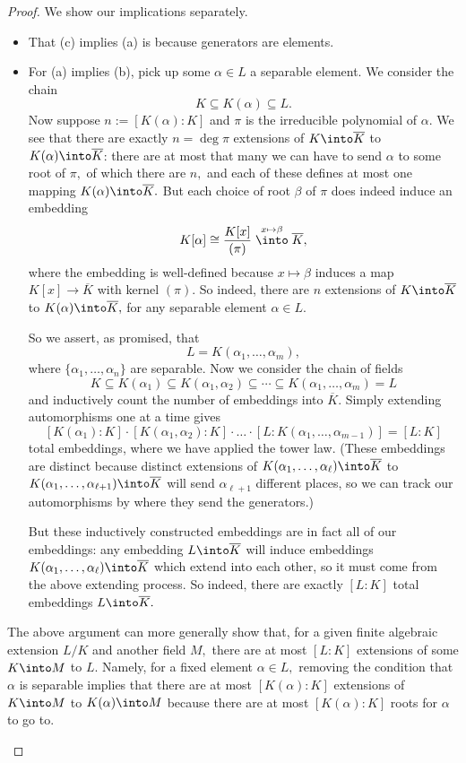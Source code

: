 \documentclass[../notes.tex]{subfiles}
\begin{document}
\begin{proof}
	We show our implications separately.
	\begin{itemize}
		\item That (c) implies (a) is because generators are elements.

		\item For (a) implies (b), pick up some $\alpha\in L$ a separable element. We consider the chain
		\[K\subseteq K(\alpha)\subseteq L.\]
		Now suppose $n:=[K(\alpha):K]$ and $\pi$ is the irreducible polynomial of $\alpha.$ We see that there are exactly $n=\deg\pi$ extensions of $K\into\overline K$ to $K(\alpha)\into\overline K$: there are at most that many we can have to send $\alpha$ to some root of $\pi,$ of which there are $n,$ and each of these defines at most one mapping $K(\alpha)\into\overline K.$ But each choice of root $\beta$ of $\pi$ does indeed induce an embedding
		\[K[\alpha]\cong\frac{K[x]}{(\pi)}\stackrel{x\mapsto\beta}\into\overline K,\]
		where the embedding is well-defined because $x\mapsto\beta$ induces a map $K[x]\to\overline K$ with kernel $(\pi).$ So indeed, there are $n$ extensions of $K\into\overline K$ to $K(\alpha)\into\overline K,$ for any separable element $\alpha\in L.$

		So we assert, as promised, that
		\[L=K(\alpha_1,\ldots,\alpha_m),\]
		where $\{\alpha_1,\ldots,\alpha_n\}$ are separable. Now we consider the chain of fields
		\[K\subseteq K(\alpha_1)\subseteq K(\alpha_1,\alpha_2)\subseteq\cdots\subseteq K(\alpha_1,\ldots,\alpha_m)=L\]
		and inductively count the number of embeddings into $\overline K.$ Simply extending automorphisms one at a time gives
		\[[K(\alpha_1):K]\cdot[K(\alpha_1,\alpha_2):K]\cdot\ldots\cdot[L:K(\alpha_1,\ldots,\alpha_{m-1})]=[L:K]\]
		total embeddings, where we have applied the tower law. (These embeddings are distinct because distinct extensions of $K(\alpha_1,\ldots,\alpha_\ell)\into\overline K$ to $K(\alpha_1,\ldots,\alpha_{\ell+1})\into\overline K$ will send $\alpha_{\ell+1}$ different places, so we can track our automorphisms by where they send the generators.)

		But these inductively constructed embeddings are in fact all of our embeddings: any embedding $L\into\overline K$ will induce embeddings $K(\alpha_1,\ldots,\alpha_\ell)\into\overline K$ which extend into each other, so it must come from the above extending process. So indeed, there are exactly $[L:K]$ total embeddings $L\into\overline K.$
	\end{itemize}
	\begin{remark} \label{rem:boundextensions}
		The above argument can more generally show that, for a given finite algebraic extension $L/K$ and another field $M,$ there are at most $[L:K]$ extensions of some $K\into M$ to $L.$ Namely, for a fixed element $\alpha\in L,$ removing the condition that $\alpha$ is separable implies that there are at most $[K(\alpha):K]$ extensions of $K\into M$ to $K(\alpha)\into M$ because there are at most $[K(\alpha):K]$ roots for $\alpha$ to go to.
		

\end{remark}
\end{proof}
\end{document}

